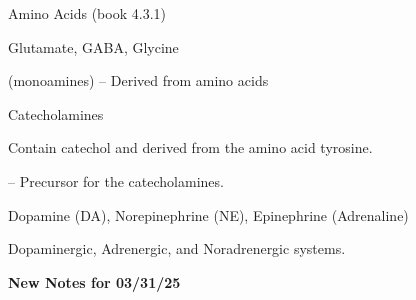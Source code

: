\begin{coloredlist}
    \item Amino Acids (book 4.3.1)
    \begin{coloredlist}
        \item Glutamate, GABA, Glycine
    \end{coloredlist}
    \item {} (monoamines) -- Derived from amino acids
    \begin{coloredlist}
        \item Catecholamines
        \begin{coloredlist}
            \item Contain catechol and derived from the amino acid tyrosine.
            \item {} -- Precursor for the catecholamines.
            \item Dopamine (DA), Norepinephrine (NE), Epinephrine (Adrenaline)
            \item Dopaminergic, Adrenergic, and Noradrenergic systems.
        \end{coloredlist}

\begin{center}
    \textbf{New Notes for 03/31/25} \\
    \hrulefill
\end{center}


\end{coloredlist}
\end{coloredlist}
